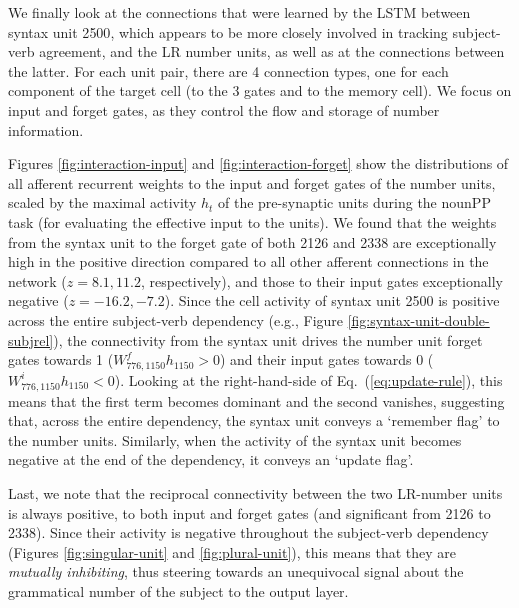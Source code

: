 We finally look at the connections that were learned by the LSTM
between syntax unit \unit{2}{500}, which appears to be more closely involved in
tracking subject-verb agreement, and the LR number units, as well as at
the connections between the latter. For each unit pair, there are 4
connection types, one for each component of the target cell (to the 3
gates and to the memory cell). We focus on input and forget gates, as they control the flow and storage of number information.

Figures \ref{fig:interaction-input} and \ref{fig:interaction-forget}
show the distributions of all afferent recurrent weights to the input
and forget gates of the number units, scaled by the maximal activity
$h_t$ of the pre-synaptic units during the nounPP task (for evaluating
the effective input to the units). We found that the weights from the
syntax unit to the forget gate of both \unit{2}{126} and \unit{2}{338}
are exceptionally high in the positive direction compared to all other
afferent connections in the network ($z=8.1, 11.2$, respectively), and
those to their input gates exceptionally negative ($z=-16.2,
-7.2$). Since the cell activity of syntax unit \unit{2}{500} is
positive across the entire subject-verb dependency (e.g., Figure
\ref{fig:syntax-unit-double-subjrel}), the connectivity from the
syntax unit drives the number unit forget gates towards 1
($W^f_{776, 1150}h_{1150}>0$) and their input gates towards 0
($W^i_{776, 1150}h_{1150}<0$). Looking at the right-hand-side of
Eq.~(\ref{eq:update-rule}), this means that the first term becomes
dominant and the second vanishes, suggesting that, across the entire
dependency, the syntax unit conveys a `remember flag' to the number
units. Similarly, when the activity of the syntax unit becomes
negative at the end of the dependency, it conveys an `update flag'.

Last, we note that the reciprocal connectivity between the two
LR-number units is always positive, to both input and forget
gates (and significant from \unit{2}{126} to \unit{2}{338}). Since
their activity is negative throughout the subject-verb dependency
(Figures \ref{fig:singular-unit} and \ref{fig:plural-unit}), this means
that they are \textit{mutually inhibiting}, thus steering towards an
unequivocal signal about the grammatical number of the subject to the
output layer.


